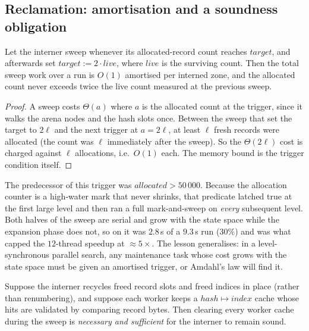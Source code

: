 \subsection{Reclamation: amortisation and a soundness obligation}

\begin{proposition}[Amortised GC]\label{prop:gc}
Let the interner sweep whenever its allocated-record count reaches
$\mathit{target}$, and afterwards set $\mathit{target} := 2 \cdot
\mathit{live}$, where $\mathit{live}$ is the surviving count.  Then the total
sweep work over a run is $O(1)$ amortised per interned zone, and the allocated
count never exceeds twice the live count measured at the previous sweep.
\end{proposition}

\begin{proof}
A sweep costs $\Theta(a)$ where $a$ is the allocated count at the trigger, since
it walks the arena nodes and the hash slots once.  Between the sweep that set
the target to $2\ell$ and the next trigger at $a = 2\ell$, at least $\ell$ fresh
records were allocated (the count was $\ell$ immediately after the sweep).  So
the $\Theta(2\ell)$ cost is charged against $\ell$ allocations, i.e.\ $O(1)$
each.  The memory bound is the trigger condition itself.
\end{proof}

\begin{remark}
The predecessor of this trigger was $\mathit{allocated} > 50\,000$.  Because
the allocation counter is a high-water mark that never shrinks, that predicate
latched true at the first large level and then ran a full mark-and-sweep on
\emph{every} subsequent level.  Both halves of the sweep are serial and grow
with the state space while the expansion phase does not, so on
 it was $2.8$\,s of a $9.3$\,s run ($30\%$) and was what capped
the $12$-thread speedup at $\approx 5\times$.  The lesson generalises: in a
level-synchronous parallel search, any maintenance task whose cost grows with
the state space must be given an amortised trigger, or Amdahl's law will find
it.
\end{remark}

\begin{proposition}
\label{prop:gc-cache}
Suppose the interner recycles freed record slots and freed indices in place
(rather than renumbering), and suppose each worker keeps a
$\mathit{hash} \mapsto \mathit{index}$ cache whose hits are validated by
comparing record bytes.  Then clearing every worker cache during the sweep is
\emph{necessary and sufficient} for the interner to remain sound.
\end{proposition}


